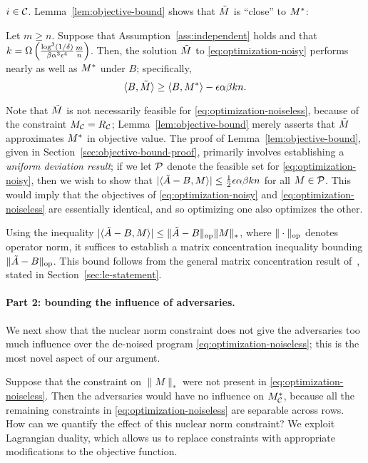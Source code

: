 $i \in \mathcal{C}$. Lemma~\ref{lem:objective-bound} shows that $\tilde{M}$ is ``close'' to $M^*$: 
\begin{lemma}
\label{lem:objective-bound}
Let $m \geq n$. Suppose that Assumption~\ref{ass:independent} holds and that 
$k = \Omega\left(  \frac{\log^3(1/\delta)}{\beta\alpha^3\epsilon^4}\frac{m}{n} \right)$. 
Then, the solution $\tilde{M}$ to \eqref{eq:optimization-noisy} performs nearly as 
well as $M^*$ under $B$; specifically,
\begin{equation}
\label{eq:objective-bound}
\langle B, \tilde{M} \rangle \geq \langle B, M^* \rangle - \epsilon \alpha\beta kn.
\end{equation}
\end{lemma}
Note that $\tilde{M}$ is not necessarily feasible for \eqref{eq:optimization-noiseless}, 
because of the constraint $M_{\mathcal{C}} = R_{\mathcal{C}}$; Lemma~\ref{lem:objective-bound} 
merely asserts that $\tilde{M}$ approximates $M^*$ in objective value. The proof of 
Lemma~\ref{lem:objective-bound}, given in Section~\ref{sec:objective-bound-proof}, 
primarily involves establishing a 
\emph{uniform deviation result}; if we let $\mathcal{P}$ denote the feasible set for 
\eqref{eq:optimization-noisy}, then we wish to show that 
$|\langle \tilde{A} - B, M \rangle| \leq \frac{1}{2}\epsilon \alpha\beta kn$ for all 
$M \in \mathcal{P}$. This would imply that the objectives of 
\eqref{eq:optimization-noisy} and \eqref{eq:optimization-noiseless} are 
essentially identical, and so optimizing one also optimizes the other.

Using the inequality $|\langle \tilde{A} - B, M \rangle| \leq \|\tilde{A}-B\|_{\mathrm{op}}\|M\|_*$, 
where $\|\cdot\|_{\mathrm{op}}$ denotes operator norm, it suffices to establish a matrix 
concentration inequality bounding $\|\tilde{A} - B\|_{\mathrm{op}}$.   
This bound follows from the general matrix concentration result of~\cite{le2015concentration},
stated in Section~\ref{sec:le-statement}.

\paragraph{Part 2: bounding the influence of adversaries.} 
We next show that the nuclear norm constraint does 
not give the adversaries too much influence over the de-noised program 
\eqref{eq:optimization-noiseless}; this is the most novel aspect 
of our argument.

Suppose that the constraint on $\|M\|_*$ were not present in 
\eqref{eq:optimization-noiseless}. Then the adversaries would have 
no influence on $M^*_{\mathcal{C}}$, because all the remaining constraints 
in \eqref{eq:optimization-noiseless} are separable across rows. 
How can we quantify the effect of this nuclear norm constraint?
We exploit Lagrangian duality, which allows us to replace constraints 
with appropriate modifications to the objective function.

